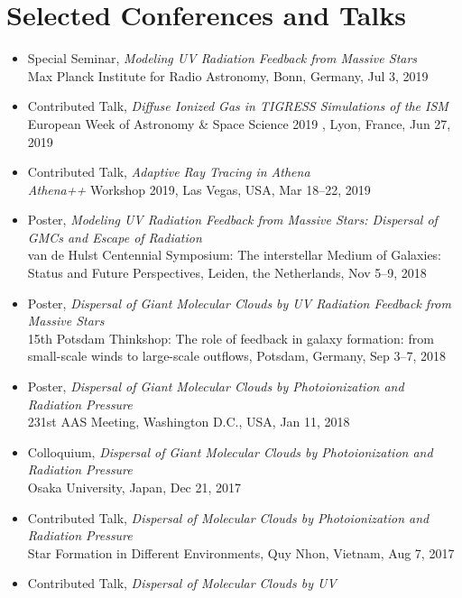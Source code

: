 \documentclass[11pt,letterpaper,roman]{moderncv}        %
\newenvironment{benumerate}[1]{
  \let\oldItem\item
  \def\item{\addtocounter{enumi}{-2}\oldItem}
  \begin{enumerate}[itemsep=0.0mm]
    \setcounter{enumi}{#1}
    \addtocounter{enumi}{1}
  }{
  \end{enumerate}
}
\begin{document}


\section{Selected Conferences and Talks}

\begin{itemize}
\item Special Seminar, \textit{Modeling UV Radiation Feedback from Massive Stars}\\
 Max Planck Institute for Radio Astronomy, Bonn, Germany, Jul 3, 2019
\item Contributed Talk, \textit{Diffuse Ionized Gas in TIGRESS Simulations of
    the ISM}\\
 European Week of Astronomy \& Space Science 2019 , Lyon, France, Jun 27, 2019
\item Contributed Talk, \textit{Adaptive Ray Tracing in {\textit Athena}}\\
 \textit{Athena++} Workshop 2019, Las Vegas, USA, Mar 18--22, 2019
\item Poster, \textit{Modeling UV Radiation Feedback from Massive Stars:
    Dispersal of GMCs and Escape of Radiation}\\ van de Hulst Centennial
  Symposium: The interstellar Medium of Galaxies: Status and Future
  Perspectives, Leiden, the Netherlands, Nov 5--9, 2018
\item Poster, \textit{Dispersal of Giant Molecular Clouds by UV Radiation
    Feedback from Massive Stars}\\ 15th Potsdam Thinkshop: The role of feedback
  in galaxy formation: from small-scale winds to large-scale outflows, Potsdam,
  Germany, Sep 3--7, 2018
\item Poster, \textit{Dispersal of Giant Molecular Clouds by
    Photoionization and Radiation Pressure}\\ 231st AAS Meeting,
  Washington D.C., USA, Jan 11, 2018
\item Colloquium, \textit{Dispersal of Giant Molecular Clouds by
    Photoionization and Radiation Pressure}\\ Osaka University, Japan,
  Dec 21, 2017
\item Contributed Talk, \textit{Dispersal of Molecular Clouds by Photoionization
    and Radiation Pressure}\\ Star Formation in Different
  Environments, Quy Nhon, Vietnam, Aug 7, 2017
\item Contributed Talk, \textit{Dispersal of Molecular Clouds by UV
}
\end{itemize}
\end{document}
